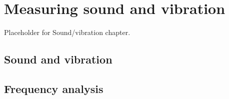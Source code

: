 \setchapterpreamble[u]{\margintoc}
\chapter{\color{gray} Measuring sound and vibration \color{black}}

Placeholder for Sound/vibration chapter.

\section{\color{gray} Sound and vibration \color{black}}

\section{\color{gray} Frequency analysis \color{black}}
